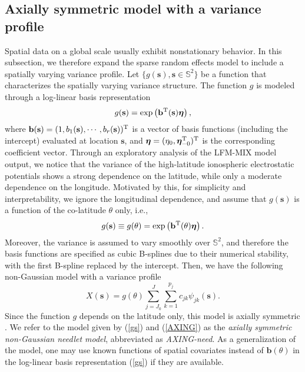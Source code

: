 \documentclass[aoas,preprint]{imsart}
\numberwithin{equation}{section}
\theoremstyle{plain}
\begin{document}
\subsection{Axially symmetric model with a variance profile}

Spatial data on a global scale usually exhibit nonstationary behavior. 
In this subsection, we therefore expand the sparse random effects model to include a spatially varying variance profile. Let $\{g(\mathbf{s}), \mathbf{s}\in \mathbb{S}^2\}$ be a function that characterizes the spatially varying variance structure.
The function $g$ is modeled through a log-linear basis representation
\begin{equation}
g(\textbf{s})= \exp \left(\mathbf{b}^{\rm T}(\textbf{s})\bm{\eta} \right),
\end{equation}
where $\mathbf{b}(\textbf{s})=(1, b_1(\textbf{s}), \cdots, b_r(\textbf{s}))^{\rm T}$ is a vector of basis functions (including the intercept) evaluated at location $\mathbf{s}$, and $\bm{\eta}=(\eta_0, \bm{\eta}_{-0}^{\rm T})^{\rm T}$ is the corresponding coefficient vector. Through an exploratory analysis of the LFM-MIX model output, we notice that the variance of the high-latitude ionospheric electrostatic potentials shows a strong dependence on the latitude, while only a moderate dependence on the longitude. Motivated by this, for simplicity and interpretability, we ignore the longitudinal dependence, and assume that $g(\textbf{s})$ is a function of the co-latitude $\theta$ only, i.e., 
\begin{equation}\label{gs}
g(\textbf{s})\equiv g(\theta)=\exp \left(\mathbf{b}^{\rm T}(\theta)\bm{\eta} \right).
\end{equation}
Moreover, the variance is assumed to vary smoothly over $\mathbb{S}^2$, and therefore the basis functions are specified as cubic B-splines due to their numerical stability, with the first B-spline replaced by the intercept. Then, we have the following non-Gaussian model with a variance profile
\begin{equation}\label{AXING}
X(\textbf{s}) = g(\theta)\sum \limits_{j=J_0}^{J}\sum\limits_{k=1}^{p_j}c_{jk}\psi_{jk}(\textbf{s}).
\end{equation}
Since the function $g$ depends on the latitude only, this model is axially symmetric \citep{Jones-63}. 
We refer to the model given by (\ref{gs}) and (\ref{AXING}) as the \textit{axially symmetric non-Gaussian needlet model},
abbreviated as \textit{AXING-need}. As a generalization of the model, 
one may use known functions of spatial covariates instead of $\mathbf{b}(\theta)$ in the log-linear basis representation (\ref{gs}) if they are available. 
\end{document}
